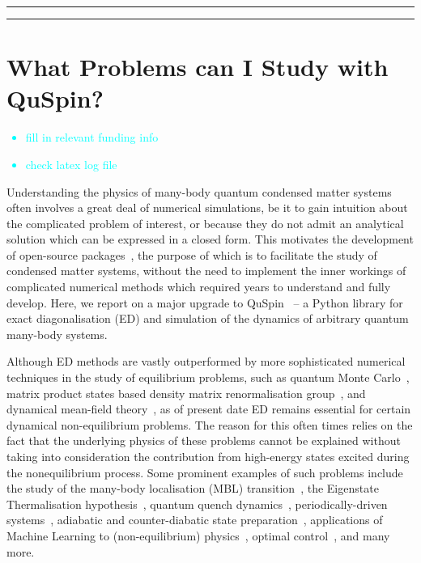 \documentclass{SciPost}
\newcommand\0{\scalebox{-1}[1]{0}}
\newcommand*{\cyan}{\textcolor{cyan}}
\begin{document}
\vspace{10pt}
\noindent\rule{\textwidth}{1pt}
\tableofcontents\thispagestyle{fancy}
\noindent\rule{\textwidth}{1pt}
\vspace{10pt}


\section{What Problems can I Study with QuSpin?}
\label{sec:intro}

\cyan{
\begin{itemize}
	\item fill in relevant funding info 
	\item check latex log file 	
\end{itemize}
	}

Understanding the physics of many-body quantum condensed matter systems often involves a great deal of numerical simulations, be it to gain intuition about the complicated problem of interest, or because they do not admit an analytical solution which can be expressed in a closed form. This motivates the development of open-source packages~\cite{alet05,albuquerque2007,bauer11,dolfi14,ITensor,TNT,johansson2012,johansson2013,wright_13,kramer_17,gegg_17,young_17,al_17}, the purpose of which is to facilitate the study of condensed matter systems, without the need to implement the inner workings of complicated numerical methods which required years to understand and fully develop. Here, we report on a major upgrade to QuSpin~\cite{weinberg_17_quspin} -- a Python library for exact diagonalisation (ED) and simulation of the dynamics of arbitrary quantum many-body systems. 

Although ED methods are vastly outperformed by more sophisticated numerical techniques in the study of equilibrium problems, such as quantum Monte Carlo~\cite{pollet_12,foulkes_01,acioli_97}, matrix product states based density matrix renormalisation group~\cite{daley_04,schollwock_05,schollwock_11}, and dynamical mean-field theory~\cite{georges_96,kotliar_06,aoki_14}, as of present date ED remains essential for certain dynamical non-equilibrium problems. The reason for this often times relies on the fact that the underlying physics of these problems cannot be explained without taking into consideration the contribution from high-energy states excited during the nonequilibrium process. Some prominent examples of such problems include the study of the many-body localisation (MBL) transition~\cite{nandkishore_15,abanin_17}, the Eigenstate Thermalisation hypothesis~\cite{TD_review}, quantum quench dynamics~\cite{polkovnikov_11}, periodically-driven systems~\cite{goldman_14,bukov_review,eckardt_17,claeys2017breaking,claeys2017spin,vajna2017replica,weinberg_FAPT,howell2018frequency}, adiabatic and counter-diabatic state preparation~\cite{kolodrubetz_17,delcampo_13,sels_16,bukov_GSL}, applications of Machine Learning to (non-equilibrium) physics~\cite{ML_review,bukov_17RL,dunjko_17}, optimal control~\cite{glaser_15,bukov_17symmbreak,day_17glass}, and many more.
\end{document}
